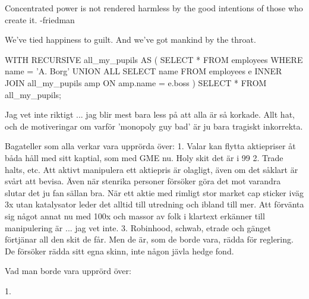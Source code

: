 Concentrated power is not rendered harmless by the good intentions of those who create it. -friedman

We've tied happiness to guilt. And we've got mankind by the throat.



WITH RECURSIVE all_my_pupils AS
(
  SELECT * FROM employees WHERE name = 'A. Borg'
  UNION ALL
  SELECT name FROM employees e INNER JOIN all_my_pupils amp ON amp.name = e.boss
)
SELECT * FROM all_my_pupils;





Jag vet inte riktigt ... jag blir mest bara less på att alla är så korkade. Allt hat, och de motiveringar om varför 'monopoly guy bad' är ju bara tragiskt inkorrekta.

Bagateller som alla verkar vara upprörda över:
1. Valar kan flytta aktiepriser åt båda håll med sitt kaptial, som med GME nu. Holy skit det är i 99%
2. Trade halts, etc. Att aktivt manipulera ett aktiepris är olagligt, även om det såklart är svårt att bevisa. Även när stenrika personer försöker göra det mot varandra slutar det ju fan sällan bra. När ett aktie med rimligt stor market cap sticker iväg 3x utan katalysator leder det alltid till utredning och ibland till mer. Att förvänta sig något annat nu med 100x och massor av folk i klartext erkänner till manipulering är ... jag vet inte.
3. Robinhood, schwab, etrade och gänget förtjänar all den skit de får. Men de är, som de borde vara, rädda för reglering. De försöker rädda sitt egna skinn, inte någon jävla hedge fond. 

Vad man borde vara upprörd över:

1. 